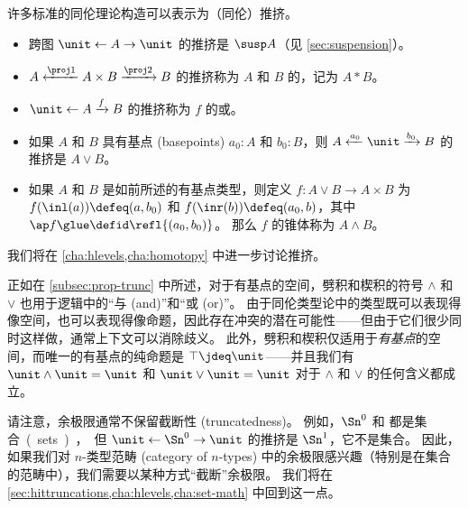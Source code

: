 许多标准的同伦理论构造可以表示为（同伦）推挤。
\begin{itemize}
  \item 跨图 $\unit \leftarrow A \to \unit$ 的推挤是  $\susp A$（见 \cref{sec:suspension}）。%
  \item $A \xleftarrow{\proj1} A\times B \xrightarrow{\proj2} B$ 的推挤称为 $A$ 和 $B$ 的，记为 $A*B$。%
  \item $\unit \leftarrow A \xrightarrow{f} B$ 的推挤称为 $f$ 的或。%
  \item 如果 $A$ 和 $B$ 具有基点 (basepoints) $a_0:A$ 和 $b_0:B$，则 $A \xleftarrow{a_0} \unit \xrightarrow{b_0} B$ 的推挤是 $A\vee B$。%
  \item 如果 $A$ 和 $B$ 是如前所述的有基点类型，则定义 $f:A\vee B \to A\times B$ 为 $f(\inl(a))\defeq (a,b_0)$ 和 $f(\inr(b))\defeq (a_0,b)$，其中 $\ap f \glue \defid \refl{(a_0,b_0)}$。
  那么 $f$ 的锥体称为 $A\wedge B$。%
\end{itemize}
我们将在 \cref{cha:hlevels,cha:homotopy} 中进一步讨论推挤。

\begin{rmk}
  正如在 \cref{subsec:prop-trunc} 中所述，对于有基点的空间，劈积和楔积的符号 $\wedge$ 和 $\vee$ 也用于逻辑中的“与 (and)”和“或 (or)”。
  由于同伦类型论中的类型既可以表现得像空间，也可以表现得像命题，因此存在冲突的潜在可能性——但由于它们很少同时这样做，通常上下文可以消除歧义。
  此外，劈积和楔积仅适用于\emph{有基点}的空间，而唯一的有基点的纯命题是 $\top\jdeq\unit$——并且我们有 $\unit\wedge \unit = \unit$ 和 $\unit\vee\unit=\unit$ 对于 $\wedge$ 和 $\vee$ 的任何含义都成立。
\end{rmk}

%

\begin{rmk}
  请注意，余极限通常不保留截断性 (truncatedness)。
  例如，$\Sn^0$ 和 \unit 都是集合 (sets)，但 $\unit \leftarrow \Sn^0 \to \unit$ 的推挤是 $\Sn^1$，它不是集合。
  因此，如果我们对 $n$-类型范畴 (category of $n$-types) 中的余极限感兴趣（特别是在集合的范畴中），我们需要以某种方式“截断”余极限。
  我们将在 \cref{sec:hittruncations,cha:hlevels,cha:set-math} 中回到这一点。
\end{rmk}


